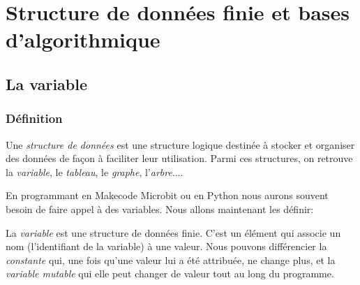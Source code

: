 \documentclass[11pt, a4paper]{book}
\begin{document}
\setcounter{chapter}{5}
\chapter{Structure de données finie et bases d'algorithmique}



\section{La variable}
\subsection{Définition}

\begin{defi}
Une {\it structure de données} est une structure logique destinée à stocker et organiser des données de façon à faciliter leur utilisation. Parmi ces structures, on retrouve la {\it variable}, le {\it tableau}, le {\it graphe}, l'{\it arbre}.... 
\end{defi}

En programmant en Makecode Microbit ou en Python nous aurons souvent besoin de faire appel à des variables. Nous allons maintenant les définir:

\begin{defi}
La {\it variable} est une structure de données finie. C'est un élément qui associe un nom (l'identifiant de la variable) à une valeur. Nous pouvons différencier la {\it constante} qui, une fois qu'une valeur lui a été attribuée, ne change plus, et la {\it variable mutable} qui elle peut changer de valeur tout au long du programme.

\end{defi}

\begin{remarques}
\end{remarques}
	
\end{document}
